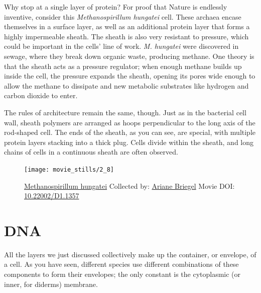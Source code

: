 \documentclass[]{tufte-book}
\begin{document}
Why stop at a single layer of protein? For proof that Nature is
endlessly inventive, consider this \emph{Methanospirillum hungatei}
cell. These archaea encase themselves in a surface layer, as well as an
additional protein layer that forms a highly impermeable sheath. The
sheath is also very resistant to pressure, which could be important in
the cells' line of work. \emph{M. hungatei} were discovered in sewage,
where they break down organic waste, producing methane. One theory is
that the sheath acts as a pressure regulator; when enough methane builds
up inside the cell, the pressure expands the sheath, opening its pores
wide enough to allow the methane to dissipate and new metabolic
substrates like hydrogen and carbon dioxide to enter.

The rules of architecture remain the same, though. Just as in the
bacterial cell wall, sheath polymers are arranged as hoops perpendicular
to the long axis of the rod-shaped cell. The ends of the sheath, as you
can see, are special, with multiple protein layers stacking into a thick
plug. Cells divide within the sheath, and long chains of cells in a
continuous sheath are often observed.





\begin{figure}
\texttt{[image: movie\_stills/2\_8]} \caption[\protect\hyperlink{tree}{Methanospirillum hungatei} Collected
by: \protect\hyperlink{ariane_briegel}{Ariane Briegel} Movie DOI:
\href{https://doi.org/10.22002/D1.1357}{10.22002/D1.1357}]{\protect\hyperlink{tree}{Methanospirillum hungatei} Collected
by: \protect\hyperlink{ariane_briegel}{Ariane Briegel} Movie DOI:
\href{https://doi.org/10.22002/D1.1357}{10.22002/D1.1357}}\label{fig:2-8}
\end{figure}

\section{DNA}\label{dna}

All the layers we just discussed collectively make up the container, or
envelope, of a cell. As you have seen, different species use different
combinations of these components to form their envelopes; the only
constant is the cytoplasmic (or inner, for diderms) membrane.
\end{document}
